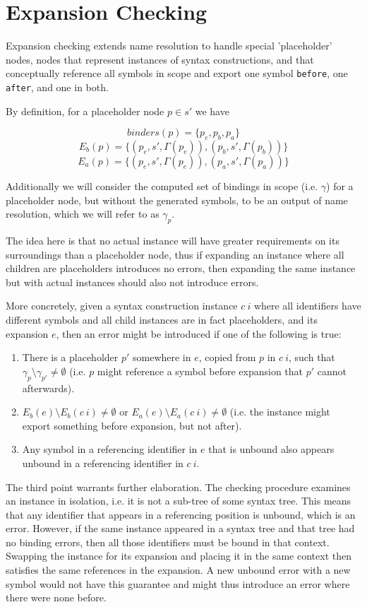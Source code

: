 \documentclass{kththesis}
\begin{document}
\section{Expansion Checking} \label{sec:expansion-checking-formalization}

Expansion checking extends name resolution to handle special 'placeholder' nodes, nodes that represent instances of syntax constructions, and that conceptually reference all symbols in scope and export one symbol \texttt{before}, one \texttt{after}, and one in both.

By definition, for a placeholder node $p \in s'$ we have

$$ binders(p) = \{p_e, p_b, p_a\} $$
$$ E_b(p) = \{(p_e, s', \Gamma(p_e)), (p_b, s', \Gamma(p_b))\} $$
$$ E_a(p) = \{(p_e, s', \Gamma(p_e)), (p_a, s', \Gamma(p_a))\} $$

Additionally we will consider the computed set of bindings in scope (i.e. $\gamma$) for a placeholder node, but without the generated symbols, to be an output of name resolution, which we will refer to as $\gamma_p$.

The idea here is that no actual instance will have greater requirements on its surroundings than a placeholder node, thus if expanding an instance where all children are placeholders introduces no errors, then expanding the same instance but with actual instances should also not introduce errors.

More concretely, given a syntax construction instance $c~i$ where all identifiers have different symbols and all child instances are in fact placeholders, and its expansion $e$, then an error might be introduced if one of the following is true:

\begin{enumerate}
  \item There is a placeholder $p'$ somewhere in $e$, copied from $p$ in $c~i$, such that $\gamma_p \setminus \gamma_{p'} \neq \emptyset$ (i.e. $p$ might reference a symbol before expansion that $p'$ cannot afterwards).
  \item $E_b(e) \setminus E_b(c~i) \neq \emptyset$ or $E_a(e) \setminus E_a(c~i) \neq \emptyset$ (i.e. the instance might export something before expansion, but not after).
  \item Any symbol in a referencing identifier in $e$ that is unbound also appears unbound in a referencing identifier in $c~i$.
\end{enumerate}

The third point warrants further elaboration. The checking procedure examines an instance in isolation, i.e. it is not a sub-tree of some syntax tree. This means that any identifier that appears in a referencing position is unbound, which is an error. However, if the same instance appeared in a syntax tree and that tree had no binding errors, then all those identifiers must be bound in that context. Swapping the instance for its expansion and placing it in the same context then satisfies the same references in the expansion. A new unbound error with a new symbol would not have this guarantee and might thus introduce an error where there were none before.
\end{document}
